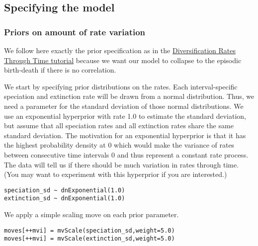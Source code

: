 \subsection{Specifying the model}

\subsubsection{Priors on amount of rate variation}
We follow here exactly the prior specification as in the \href{https://github.com/revbayes/revbayes_tutorial/raw/master/tutorial_TeX/RB_DiversificationRate_Episodic_Tutorial/RB_DiversificationRate_Episodic_Tutorial.pdf}{Diversification Rates Through Time tutorial} because we want our model to collapse to the episodic birth-death if there is no correlation.

We start by specifying prior distributions on the rates.
Each interval-specific speciation and extinction rate will be drawn from a normal distribution.
Thus, we need a parameter for the standard deviation of those normal distributions.
We use an exponential hyperprior with rate 1.0 to estimate the standard deviation, but assume that all speciation rates and all extinction rates share the same standard deviation.
The motivation for an exponential hyperprior is that it has the highest probability density at 0 which would make the variance of rates between consecutive time intervals 0 and thus represent a constant rate process.
The data will tell us if there should be much variation in rates through time.
(You may want to experiment with this hyperprior if you are interested.)
{\tt \begin{snugshade*}
\begin{lstlisting}
speciation_sd ~ dnExponential(1.0)
extinction_sd ~ dnExponential(1.0)
\end{lstlisting}
\end{snugshade*}}
We apply a simple scaling move on each prior parameter.
{\tt \begin{snugshade*}
\begin{lstlisting}
moves[++mvi] = mvScale(speciation_sd,weight=5.0)
moves[++mvi] = mvScale(extinction_sd,weight=5.0)
\end{lstlisting}
\end{snugshade*}}


